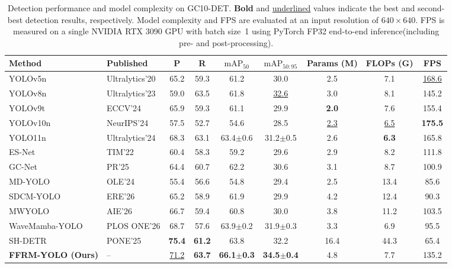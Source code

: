 \documentclass[pdflatex,sn-nature]{sn-jnl}
\begin{document}
\begin{table}[!t]
\caption{Detection performance and model complexity on GC10-DET. \textbf{Bold} and \underline{underlined} values indicate the best and second-best detection results, respectively. Model complexity and FPS are evaluated at an input resolution of $640\times640$. FPS is measured on a single NVIDIA RTX 3090 GPU with batch size~1 using PyTorch FP32 end-to-end inference(including pre- and post-processing).}
\label{tab:comparison_gc10}
\centering
\footnotesize
\setlength{\tabcolsep}{1.3pt}
\renewcommand{\arraystretch}{1.12}
\begin{tabular*}{\textwidth}{@{\extracolsep{\fill}}llccccccc@{}}
\toprule
Method & Published & P & R & $\mathrm{mAP}_{50}$ & $\mathrm{mAP}_{50:95}$ & Params (M) & FLOPs (G) & FPS \\
\midrule
YOLOv5n~\cite{Jocher2020YOLOv5} & Ultralytics'20 & 65.2 & 59.3 & 61.2 & 30.0 & 2.5 & 7.1 & \underline{168.6} \\
YOLOv8n~\cite{Jocher2023YOLOv8} & Ultralytics'23 & 59.0 & 63.5 & 61.8 & \underline{32.6} & 3.0 & 8.1 & 145.2\\
YOLOv9t~\cite{Wang2024YOLOv9} & ECCV'24 & 65.9 & 59.3 & 61.1 & 29.9 & \textbf{2.0} & 7.6 & 155.4 \\
YOLOv10n~\cite{Wang2024YOLOv10} & NeurIPS'24 & 57.5 & 52.7 & 54.6 & 28.5 & \underline{2.3} & \underline{6.5} & \textbf{175.5}\\
YOLO11n~\cite{Jocher2024YOLO11} & Ultralytics'24 & 68.3 & 63.1 & 63.4\(\pm\)0.6 & 31.2\(\pm\)0.5 & 2.6 & \textbf{6.3} & 165.8\\
ES-Net~\cite{Yu2022ESNet} & TIM'22 & 60.4 & 58.3 & 59.2 & 29.6 & 2.9 & 8.2 & 111.8\\
GC-Net~\cite{Liu2025GCNet} & PR'25 & 64.4 & 60.7 & 62.2 & 30.6 & 3.1 & 8.7 & 100.9\\
MD-YOLO~\cite{Zheng2024MDYOLO} & OLE'24 & 55.4 & 56.6 & 54.8 & 29.4 & 2.5 & 13.4 &85.6\\
SDCM-YOLO~\cite{Deng2026SDCMYOLO} & ERE'26 & 65.2 & 58.9 & 61.9 & 29.9 & 4.2 & 12.4 & 90.3\\
MWYOLO~\cite{Chen2026MWYOLO} & AIE'26 & 66.7 & 59.4 & 60.8 & 30.0 & 3.8 & 11.2 & 103.5\\
WaveMamba-YOLO~\cite{Ge2026WaveMambaYOLO} & PLOS ONE'26 & 68.7 & 57.6 &63.9\(\pm\)0.2 & 31.9\(\pm\)0.3 & 3.3 & 6.9 & 95.5\\
SH-DETR~\cite{Wu2025SHDETR} & PONE'25 & \textbf{75.4} & \textbf{61.2} & 63.8 & 32.2 & 16.4 & 44.3 &65.4\\
\midrule
    \textbf{FFRM-YOLO (Ours)} & -- & \underline{71.2} & \textbf{63.7} & \textbf{66.1\(\pm\)0.3} & \textbf{34.5\(\pm\)0.4} & 4.8 & 7.7 & 135.2\\
\bottomrule
\end{tabular*}
\end{table}
\end{document}
